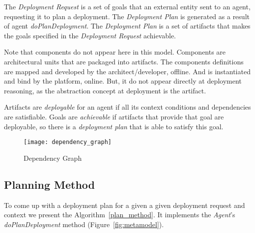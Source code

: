 The \emph{Deployment Request} is a set of goals that an external entity sent to an agent, requesting it to plan a deployment. The \emph{Deployment Plan} is generated as a result of agent \emph{doPlanDeployment}. The \emph{Deployment Plan} is a set of artifacts that makes the goals specified in the \emph{Deployment Request} achievable.

Note that components do not appear here in this model. Components are architectural units that are packaged into artifacts. The components definitions are mapped and developed by the architect/developer, offline.  And is instantiated and bind by the platform, online. But, it do not appear directly at deployment reasoning, as the abstraction concept at deployment is the artifact.

Artifacts are \emph{deployable} for an agent if all its context conditions and dependencies are satisfiable.
Goals are \emph{achievable} if artifacts that provide that goal are deployable, so there is a \emph{deployment plan} that is able to satisfy this goal.

\begin{figure}[!htb]
  \centering
  \texttt{[image: dependency\_graph]}
  \caption{Dependency Graph}
  \label{fig:dependency_graph}
\end{figure}


\subsection{Planning Method}

To come up with a deployment plan for a given a given deployment request and context we present the Algorithm~\ref{plan_method}. It implements the \emph{Agent}'s \emph{doPlanDeployment} method (Figure~\ref{fig:metamodel}).

